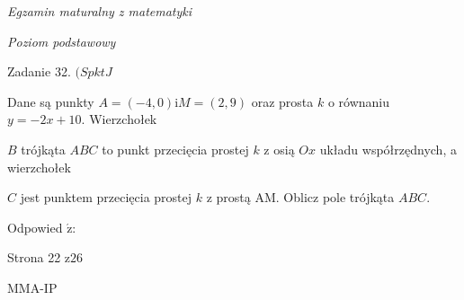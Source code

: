 \documentclass[a4paper,12pt]{article}
\begin{document}
{\it Egzamin maturalny z matematyki}

{\it Poziom podstawowy}

Zadanie 32. $(SpktJ$

Dane są punkty $A=(-4,0) \mathrm{i}M=(2,9)$ oraz prosta $k$ o równaniu $y=-2x+10$. Wierzchołek

$B$ trójkąta $ABC$ to punkt przecięcia prostej $k$ z osią $Ox$ układu współrzędnych, a wierzchołek

$C$ jest punktem przecięcia prostej $k$ z prostą AM. Oblicz pole trójkąta $ABC.$

Odpowied $\acute{\mathrm{z}}$:

Strona 22 $\mathrm{z}26$

MMA-IP
\end{document}
